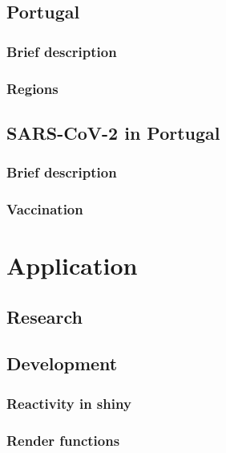 \documentclass[11pt,a4paper]{report}
\begin{document}
\section{Portugal}

\subsection{Brief description}


\subsection{Regions}






\section{SARS-CoV-2 in Portugal}

\subsection{Brief description}


\subsection{Vaccination}






\chapter{Application}

\section{Research}



\section{Development}


\subsection{Reactivity in shiny}


\subsection{Render functions}
\end{document}
